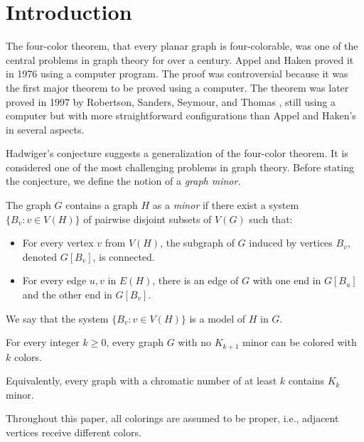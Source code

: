 \chapter{Introduction}

The four-color theorem, that every planar graph is four-colorable, was one of the central problems
in graph theory for over a century. Appel and Haken proved it in 1976 \cite{appel_haken_1977} using a computer program.
The proof was controversial because it was the first major theorem to be proved using a computer.
The theorem was later proved in 1997 by Robertson, Sanders, Seymour, and Thomas \cite{ROBERTSON19972},
still using a computer but with more straightforward configurations than Appel and Haken's in several aspects. 

Hadwiger's conjecture \cite{hadwiger_1943} suggests a generalization of the four-color theorem. It is considered one of 
the most challenging problems in graph theory. Before stating the conjecture, we define the notion of a \textit{graph minor}.

\begin{defn}[Minor]
 The graph $G$ contains a graph $H$ as a \emph{minor} if there exist a system $\{B_v : v \in V(H)\}$ of pairwise disjoint subsets of $V(G)$
 such that:
       \begin{itemize}
           \item For every vertex $v$ from $V(H)$, the subgraph of $G$ induced by vertices $B_v$, denoted $G[B_v]$, is connected.
           \item For every edge $u,v$ in $E(H)$, there is an edge of $G$ with one end in $G[B_u]$ and the other end in $G[B_v]$.
       \end{itemize} 

 We say that the system $\{B_v : v \in V(H)\}$ is a model of $H$ in $G$.
\end{defn}

\begin{conj} 
 For every integer $k \geq 0$, every graph $G$ with no $K_{k+1}$ minor can be colored with $k$ colors.
\end{conj}

Equivalently, every graph with a chromatic number of at least $k$ contains $K_k$ minor.

\begin{rem}
   Throughout this paper, all colorings are assumed to be proper, i.e., adjacent vertices receive different colors.
\end{rem}


